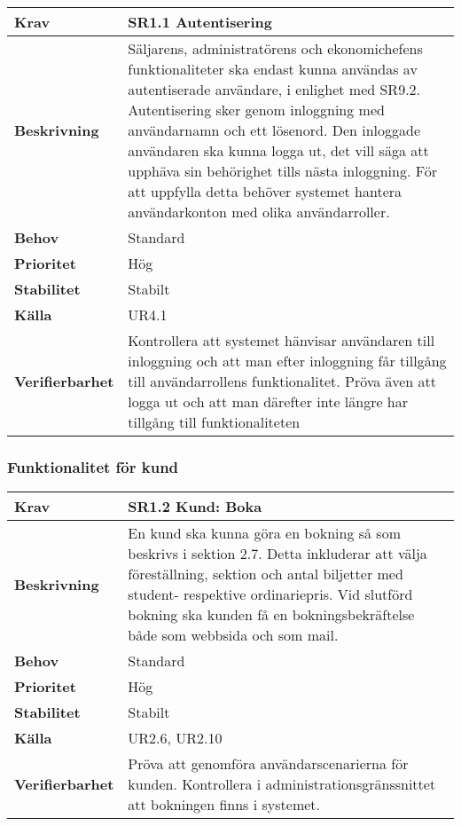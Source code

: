 \documentclass[a4paper, twoside, 11pt, titlepage]{article}
\begin{document}
		\begin {table} [ht] \begin{tabular} { p{2.6cm} p{12.5cm} }
			\hline
			\sffamily\textbf{Krav} & \sffamily\textbf{SR1.1 Autentisering } \\
			\hline
			\sffamily\textbf{Beskrivning} & Säljarens, administratörens och ekonomichefens funktionaliteter ska endast kunna användas av autentiserade användare, i enlighet med SR9.2. Autentisering sker genom inloggning med användarnamn och ett lösenord. Den inloggade användaren ska kunna logga ut, det vill säga att upphäva sin behörighet tills nästa inloggning. För att uppfylla detta behöver systemet hantera användarkonton med olika användarroller.  \\
			\hline
			\sffamily\textbf{Behov} & Standard  \\
			\hline
			\sffamily\textbf{Prioritet} & Hög  \\
			\hline
			\sffamily\textbf{Stabilitet} & Stabilt  \\
			\hline
			\sffamily\textbf{Källa} & UR4.1  \\
			\hline
			\sffamily\textbf{Verifierbarhet} & Kontrollera att systemet hänvisar användaren till inloggning och att man efter inloggning får tillgång till användarrollens funktionalitet. Pröva även att logga ut och att man därefter inte längre har tillgång till funktionaliteten  \\
			\hline
		\end{tabular} \end{table} \FloatBarrier


		\subsubsection{Funktionalitet för kund}


		\begin {table} [ht] \begin{tabular} { p{2.6cm} p{12.5cm} }
			\hline
			\sffamily\textbf{Krav} & \sffamily\textbf{SR1.2 Kund: Boka } \\
			\hline
			\sffamily\textbf{Beskrivning} & En kund ska kunna göra en bokning så som beskrivs i sektion 2.7. Detta inkluderar att välja föreställning, sektion och antal biljetter med student- respektive ordinariepris. Vid slutförd bokning ska kunden få en bokningsbekräftelse både som webbsida och som mail.  \\
			\hline
			\sffamily\textbf{Behov} & Standard  \\
			\hline
			\sffamily\textbf{Prioritet} & Hög  \\
			\hline
			\sffamily\textbf{Stabilitet} & Stabilt  \\
			\hline
			\sffamily\textbf{Källa} & UR2.6, UR2.10  \\
			\hline
			\sffamily\textbf{Verifierbarhet} & Pröva att genomföra användarscenarierna för kunden. Kontrollera i administrationsgränssnittet att bokningen finns i systemet.  \\
			\hline
		\end{tabular} \end{table} \FloatBarrier
		\vspace{6mm}
\end{document}
